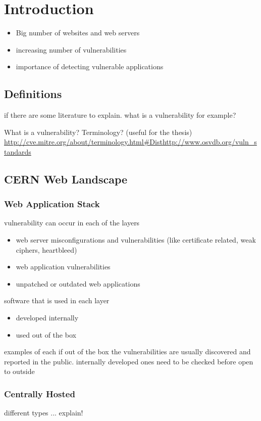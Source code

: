 \chapter{Introduction}
\label{introduction}
\thispagestyle{empty}

\begin{itemize}
\item Big number of websites and web servers
\item increasing number of vulnerabilities
\item importance of detecting vulnerable applications
\end{itemize}

\section{Definitions}
if there are some literature to explain. what is a vulnerability for example?

What is a vulnerability? Terminology? (useful for the thesis) 
\url{http://cve.mitre.org/about/terminology.html#Dist}\url{http://www.osvdb.org/vuln_standards}

\section{CERN Web Landscape}
\subsection{Web Application Stack}
vulnerability can occur in each of the layers
\begin{itemize}
\item web server misconfigurations and vulnerabilities (like certificate related, weak ciphers, heartbleed) 
\item web application vulnerabilities
\item unpatched or outdated web applications
\end{itemize}


software that is used in each layer
\begin{itemize}
\item developed internally
\item used out of the box
\end{itemize}
examples of each
if out of the box the vulnerabilities are usually discovered and reported in the public.
internally developed ones need to be checked before open to outside

\subsection{Centrally Hosted}
different types ... explain!
